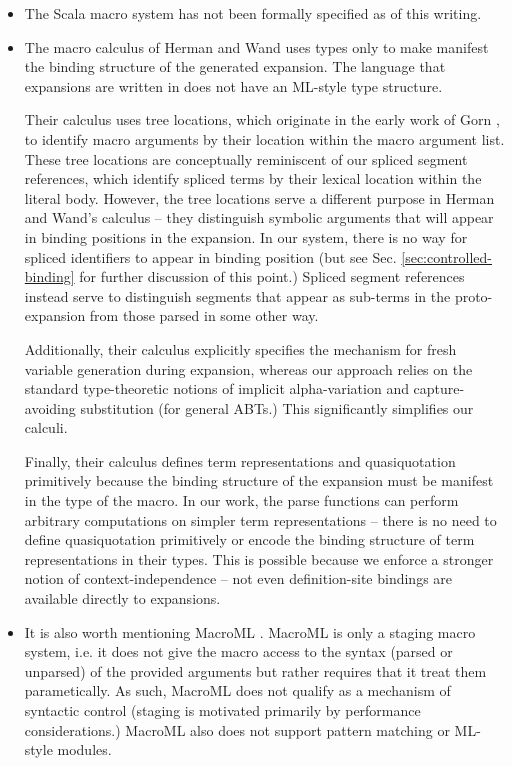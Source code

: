 \begin{itemize}
\item The Scala macro system has not been formally specified as of this writing. 
\item The macro calculus of  Herman and Wand \cite{DBLP:conf/esop/HermanW08,Herman10:Theory} uses types only to make manifest the binding structure of the generated expansion. The language that expansions are written in does not have an ML-style type structure. 

Their calculus uses tree locations, which originate in the early work of Gorn \cite{gorn1965explicit}, to identify macro arguments by their location within the macro argument list. These tree locations are conceptually reminiscent of our spliced segment references, which identify spliced terms by their lexical location within the literal body. However, the tree locations serve a different purpose in Herman and Wand's calculus -- they distinguish symbolic arguments that will appear in binding positions in the expansion. In our system, there is no way for spliced identifiers to appear in binding position (but see Sec. \ref{sec:controlled-binding} for further discussion of this point.) Spliced segment references instead serve to distinguish segments that appear as sub-terms in the proto-expansion from those parsed in some other way. 

Additionally, their calculus explicitly specifies the mechanism for fresh variable generation during expansion, whereas our approach relies on the standard type-theoretic notions of implicit alpha-variation and capture-avoiding substitution (for general ABTs.) This significantly simplifies our calculi. 

Finally, their calculus defines term representations and quasiquotation primitively because the binding structure of the expansion must be manifest in the type of the macro. In our work, the parse functions can perform arbitrary computations on simpler term representations -- there is no need to define quasiquotation primitively or encode the binding structure of  term representations in their types. This is possible because we enforce a stronger notion of context-independence -- not even definition-site bindings are available directly to expansions.

\item It is also worth mentioning MacroML \cite{ganz2001macros}. MacroML is only a staging macro system, i.e. it does not give the macro access to the syntax (parsed or unparsed) of the provided arguments but rather requires that it treat them parametically. As such, MacroML does not qualify as a mechanism of syntactic control (staging is motivated primarily by performance considerations.) MacroML also does not support pattern matching or ML-style modules.


\end{itemize}
